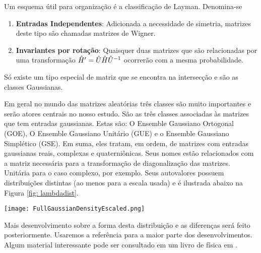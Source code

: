  Um esquema útil para organização é a classificação de Layman. Denomina-se

\begin{enumerate}
	\item \textbf{Entradas Independentes}: Adicionada a necessidade de simetria, matrizes deste tipo são chamadas matrizes de Wigner.
	\item \textbf{Invariantes por rotação}: Quaisquer duas matrizes que são relacionadas por uma transformação $\hat H' = \hat U \hat H \hat U^{-1}$ ocorrerão com a mesma probabilidade.
\end{enumerate}

Só existe um tipo especial de matriz que se encontra na intersecção e são as classes Gaussianas.

Em geral no mundo das matrizes aleatórias três classes são muito importantes e serão atores centrais no nosso estudo. São as três classes associadas às matrizes que tem entradas gaussianas. Estas são: O Ensemble Gaussiano Ortogonal (GOE), O Ensemble Gaussiano Unitário (GUE) e o Ensemble Gaussiano Simplético (GSE). Em suma, eles tratam, em ordem, de matrizes com entradas gaussianas reais, complexas e quaterniônicas. Seus nomes estão relacionados com a matriz necessária para a transformação de diagonalização das matrizes. Unitária para o caso complexo, por exemplo. Seus autovalores possuem distribuições distintas (ao menos para a escala usada) e é ilustrada abaixo na Figura \ref{fig: lambdadist}.

\begin{center}
	\texttt{[image: FullGaussianDensityEscaled.png]}
	\label{fig: lambdadist}
\end{center}

Mais desenvolvimento sobre a forma desta distribuição e as diferenças será feito posteriormente. Usaremos a referência \cite{Livan_2018} para a maior parte dos desenvolvimentos. Algum material interessante pode ser consultado em um livro de física em \cite{MEHTA1967v}.
